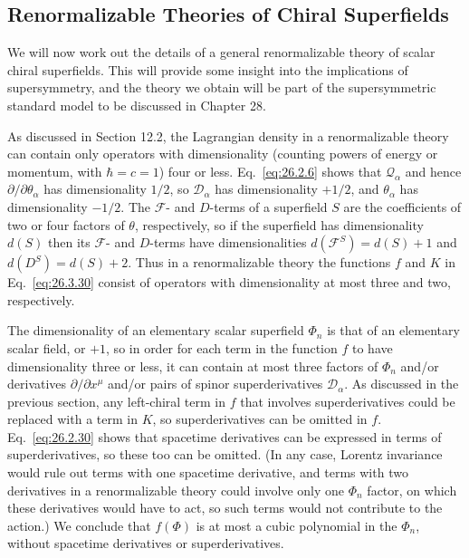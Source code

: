 
\subsection{Renormalizable Theories of Chiral Superfields}

\providecommand{\SuperQ}{\mathcal{Q}}
\providecommand{\SuperD}{\mathcal{D}}

We will now work out the details of a general renormalizable theory of scalar
chiral superfields. This will provide some insight into the implications of
supersymmetry, and the theory we obtain will be part of the supersymmetric
standard model to be discussed in Chapter 28.

As discussed in Section 12.2, the Lagrangian density in a renormalizable theory
can contain only operators with dimensionality (counting powers of energy or
momentum, with \(\hbar=c=1\)) four or less. Eq.~\eqref{eq:26.2.6} shows that
\(\SuperQ_\alpha\) and hence \(\partial/\partial\theta_\alpha\) has
dimensionality \(1/2\), so \(\SuperD_\alpha\) has dimensionality \(+1/2\), and
\(\theta_\alpha\) has dimensionality \(-1/2\). The \(\mathcal{F}\)- and
\(D\)-terms of a superfield \(S\) are the coefficients of two or four factors
of \(\theta\), respectively, so if the superfield has dimensionality \(d(S)\)
then its \(\mathcal{F}\)- and \(D\)-terms have dimensionalities
\(d(\mathcal{F}^S)=d(S)+1\) and \(d(D^S)=d(S)+2\). Thus in a renormalizable
theory the functions \(f\) and \(K\) in Eq.~\eqref{eq:26.3.30} consist of
operators with dimensionality at most three and two, respectively.

The dimensionality of an elementary scalar superfield \(\Phi_n\) is that of an
elementary scalar field, or \(+1\), so in order for each term in the function
\(f\) to have dimensionality three or less, it can contain at most three
factors of \(\Phi_n\) and/or derivatives \(\partial/\partial x^\mu\) and/or
pairs of spinor superderivatives \(\SuperD_\alpha\). As discussed in the
previous section, any left-chiral term in \(f\) that involves superderivatives
could be replaced with a term in \(K\), so superderivatives can be omitted in
\(f\). Eq.~\eqref{eq:26.2.30} shows that spacetime derivatives can be expressed
in terms of superderivatives, so these too can be omitted. (In any case,
Lorentz invariance would rule out terms with one spacetime derivative, and
terms with two derivatives in a renormalizable theory could involve only one
\(\Phi_n\) factor, on which these derivatives would have to act, so such terms
would not contribute to the action.) We conclude that \(f(\Phi)\) is at most a
cubic polynomial in the \(\Phi_n\), without spacetime derivatives or
superderivatives.

